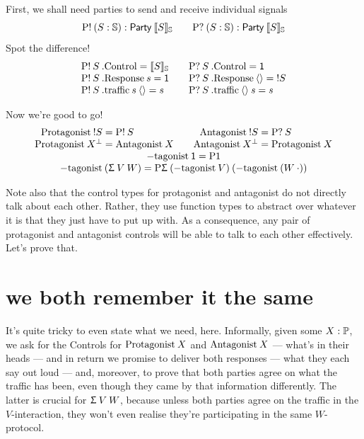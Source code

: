 \documentclass{book}
\newcommand{\D}[1]{\blue{\ensuremath{\mathsf{#1}}}}
\newcommand{\C}[1]{\red{\ensuremath{\mathsf{#1}}}}
\newcommand{\F}[1]{\green{\ensuremath{\mathrm{#1}}}}
\newcommand{\N}[1]{\black{\ensuremath{#1}}}
\newcommand{\vd}{\C{\langle\rangle}}
\begin{document}
First, we shall need parties to send and receive individual signals
\[\Send{(S:\Signal)} : \Party{\signal{S}}
\qquad
\Recv{(S:\Signal)} : \Party{\signal{S}}
\]
Spot the difference!
\[\begin{array}{l@{\qquad}l}
\Send{S}\:.\F{Control} = \signal{S} &
\Recv{S}\:.\F{Control} = \D{1} \\
\Send{S}\:.\F{Response}\:s = \C{1} &
\Recv{S}\:.\F{Response}\:\vd = \send{S} \\
\Send{S}\:.\F{traffic}\:s\:\vd = s &
\Recv{S}\:.\F{traffic}\:\vd\:s = s \\
\end{array}\]

Now we're good to go!
\[\begin{array}{r@{\;=\;}l@{\qquad}r@{\;=\;}ll}
\Play{\send{S}} & \Send{S} &
\Oppo{\send{S}} & \Recv{S} \\
\Play{\op{X}} & \Oppo{X} &
\Oppo{\op{X}} & \Play{X} \\
\multicolumn{4}{c}{\Eith{\C{1}} = \F{P1}}\\
\multicolumn{4}{c}{\Eith{(\Sg{V}{W})} =
    \F{P\Upsigma}\:(\Eith{V})\:(\Eith{(W\:\cdot)})}\\
\end{array}\]


Note also that the control types for protagonist and antagonist do not directly talk about each other. Rather, they use function types to abstract over whatever it is that they just have to put up with. As a consequence, any pair of protagonist and antagonist controls will be able to talk to each other effectively. Let's prove that.


\section{we both remember it the same}

\newcommand{\EQ}{\mathrel{\blue{=}}}
\newcommand{\refl}{\C{refl}}
\newcommand{\heq}[4]{#3 \:\F{=\!\![ \N{#1} | \N{#2} ]\!\!=}\: #4}

It's quite tricky to even state what we need, here. Informally, given some $X:\Protocol$, we ask for the Controls for $\Play{X}$ and $\Oppo{X}$ --- what's in their heads --- and in return we promise to deliver both responses --- what they each say out loud --- and, moreover, to prove that both parties agree on what the traffic has been, even though they came by that information differently. The latter is crucial for $\Sg{V}{W}$, because unless both parties agree on the traffic in the $V$-interaction, they won't even realise they're participating in the same $W$-protocol.
\end{document}
